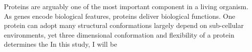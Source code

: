 Proteins are arguably one of the most important component in a living organism. As genes encode biological features, proteins deliver biological functions. One protein can adopt many structural conformations largely depend on sub-cellular environments, yet three dimensional conformation and flexibility of a protein determines the     In this study, I will be 